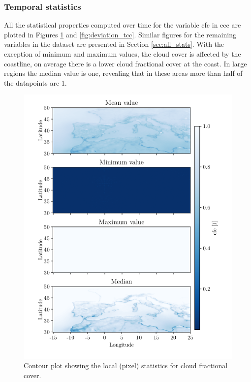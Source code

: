 \subsubsection{Temporal statistics}
All the statistical properties computed over time for the variable \acrshort{cfc} in \acrshort{ecc} are plotted in 
Figures \ref{fig:all_stats_tcc} and \ref{fig:deviation_tcc}. Similar figures for the remaining variables in the dataset are presented in Section \ref{sec:all_stats}. 
With the exception of minimum and maximum values, the cloud cover is affected by the coastline, on average there is a lower cloud fractional cover at the coast. In large regions the median value is one, revealing that in these areas more than half of the datapoints are 1.
\begin{figure}[ht]
    \centering
    \includegraphics{python_figs/all_stat_variable_tcc.png}
    \caption{Contour plot showing the local (pixel) statistics for cloud fractional cover.}
    \label{fig:all_stats_tcc}
\end{figure}
